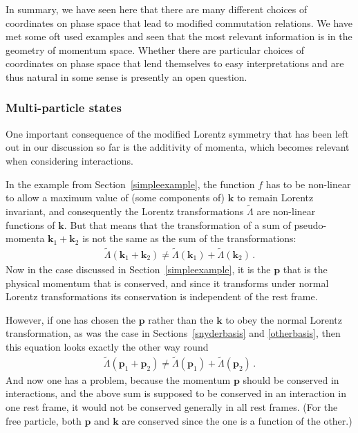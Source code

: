 \documentclass{article}
\def\beqn{\begin{eqnarray}}
\def\eeqn{\end{eqnarray}}
\begin{document}
In summary, we have seen here that there are many different choices of coordinates on phase
space that lead to modified commutation relations. We have met some oft used examples
and seen that the most relevant information is in the geometry of momentum space. Whether
there are particular choices of coordinates on phase space that lend themselves to easy interpretations
and are thus natural in some sense is presently an open question. 

\subsubsection{Multi-particle states}
\label{soccer}

One important consequence of the modified Lorentz symmetry that has been left out in our discussion so far
is the additivity of momenta, which becomes relevant when considering
interactions. 

In the example from Section~\ref{simpleexample}, the function $f$ has
to be non-linear to allow a maximum value of (some components of) $\mathbf{k}$ to remain Lorentz invariant, and consequently the Lorentz transformations
$\widetilde{\Lambda}$ are non-linear functions of $\mathbf{k}$. But that means that the transformation of a sum of 
pseudo-momenta $\mathbf{k}_1 + \mathbf{k}_2$ is not the same as the sum of the transformations:
\beqn
\widetilde{\Lambda}(\mathbf{k}_1 + \mathbf{k}_2) \neq \widetilde{\Lambda}(\mathbf{k}_1) + \widetilde{\Lambda}(\mathbf{k}_2) \,. 
\eeqn
Now in the case discussed in Section~\ref{simpleexample}, it is the $\mathbf{p}$ that is the physical momentum that is conserved, 
and since it transforms under normal Lorentz transformations its conservation is independent of the rest frame.

However, if one has chosen the $\mathbf{p}$ rather than the $\mathbf{k}$
to obey the normal Lorentz transformation, as was the case in Sections~\ref{snyderbasis} and \ref{otherbasis}, then this 
equation looks exactly the other way round
\beqn
\widetilde{\Lambda}(\mathbf{p}_1 + \mathbf{p}_2) \neq \widetilde{\Lambda}(\mathbf{p}_1) + \widetilde{\Lambda}(\mathbf{p}_2) \,. 
\eeqn
And now one has a problem, because the momentum $\mathbf{p}$ should be conserved in interactions, and 
the above sum is supposed to be conserved in an interaction in one rest frame, it
would not be conserved generally in all rest frames. (For the free particle, both $\mathbf{p}$ and $\mathbf{k}$
are conserved since the one is a function of the other.)
\end{document}
